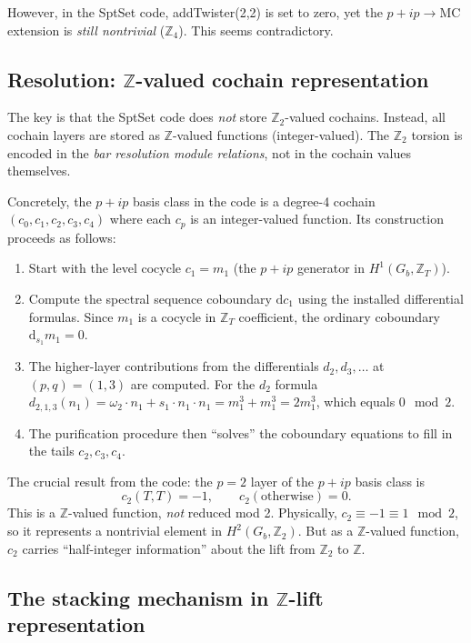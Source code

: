 \documentclass{SciPost}
\begin{document}
However, in the SptSet code, addTwister(2,2) is set to zero, yet the $p+ip \to \mathrm{MC}$ extension is \emph{still nontrivial} ($\mathbb{Z}_4$).
This seems contradictory.

\subsection{Resolution: $\mathbb{Z}$-valued cochain representation}

The key is that the SptSet code does \emph{not} store $\mathbb{Z}_2$-valued cochains.
Instead, all cochain layers are stored as $\mathbb{Z}$-valued functions (integer-valued).
The $\mathbb{Z}_2$ torsion is encoded in the \emph{bar resolution module relations}, not in the cochain values themselves.

Concretely, the $p+ip$ basis class in the code is a degree-4 cochain $(c_0, c_1, c_2, c_3, c_4)$ where each $c_p$ is an integer-valued function.
Its construction proceeds as follows:
\begin{enumerate}
\item Start with the level cocycle $c_1 = m_1$ (the $p+ip$ generator in $H^1(G_b, \mathbb{Z}_T)$).
\item Compute the spectral sequence coboundary $\mathrm{d}c_1$ using the installed differential formulas.
Since $m_1$ is a cocycle in $\mathbb{Z}_T$ coefficient, the ordinary coboundary $\mathrm{d}_{s_1} m_1 = 0$.
\item The higher-layer contributions from the differentials $d_2, d_3, \ldots$ at $(p,q) = (1,3)$ are computed.
For the $d_2$ formula $d_{2,1,3}(n_1) = \omega_2 \cdot n_1 + s_1 \cdot n_1 \cdot n_1 = m_1^3 + m_1^3 = 2m_1^3$, which equals $0 \mod 2$.
\item The purification procedure then ``solves'' the coboundary equations to fill in the tails $c_2, c_3, c_4$.
\end{enumerate}

The crucial result from the code: the $p=2$ layer of the $p+ip$ basis class is
\begin{equation}
c_2(T, T) = -1, \qquad c_2(\text{otherwise}) = 0.
\end{equation}
This is a $\mathbb{Z}$-valued function, \emph{not} reduced mod 2.
Physically, $c_2 \equiv -1 \equiv 1 \mod 2$, so it represents a nontrivial element in $H^2(G_b, \mathbb{Z}_2)$.
But as a $\mathbb{Z}$-valued function, $c_2$ carries ``half-integer information'' about the lift from $\mathbb{Z}_2$ to $\mathbb{Z}$.

\subsection{The stacking mechanism in $\mathbb{Z}$-lift representation}
\end{document}
